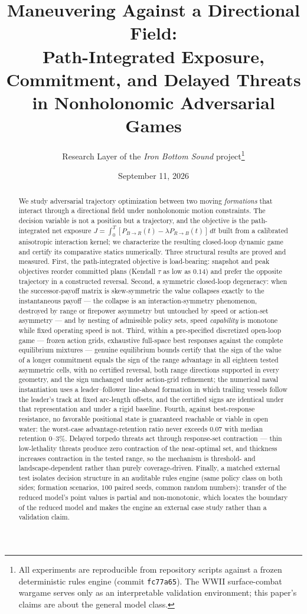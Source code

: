 \documentclass[12pt,a4paper]{article}
\title{Maneuvering Against a Directional Field:\\
Path-Integrated Exposure, Commitment, and Delayed Threats\\
in Nonholonomic Adversarial Games}
\author{Research Layer of the \emph{Iron Bottom Sound} project\thanks{All
experiments are reproducible from repository scripts against a frozen
deterministic rules engine (commit \texttt{fc77a65}).  The WWII surface-combat
wargame serves only as an interpretable validation environment; this paper's
claims are about the general model class.}}
\date{September 11, 2026}
\begin{document}
\maketitle

\begin{abstract}
We study adversarial trajectory optimization between two moving
\emph{formations} that interact through a directional field under
nonholonomic motion constraints.  The decision variable is not a position
but a trajectory, and the objective is the path-integrated net exposure
$J=\int_0^T[P_{B\to R}(t)-\lambda P_{R\to B}(t)]\,dt$ built from a
calibrated anisotropic interaction kernel; we characterize the resulting
closed-loop dynamic game and certify its comparative statics numerically.
Three structural results are proved and measured.  First, the
path-integrated objective is load-bearing: snapshot and peak objectives
reorder committed plans (Kendall $\tau$ as low as $0.14$) and prefer the
opposite trajectory in a constructed reversal.  Second, a symmetric
closed-loop degeneracy: when the successor-payoff matrix is skew-symmetric
the value collapses exactly to the instantaneous payoff --- the collapse is
an interaction-symmetry phenomenon, destroyed by range or firepower
asymmetry but untouched by speed or action-set asymmetry --- and by
nesting of admissible policy sets, speed \emph{capability} is monotone
while fixed operating speed is not.  Third, within a pre-specified discretized
open-loop game --- frozen action grids, exhaustive full-space best
responses against the complete equilibrium mixtures --- genuine
equilibrium bounds certify that the sign of the value of a longer
commitment equals the sign of the range advantage in all eighteen tested
asymmetric cells, with no certified reversal, both range directions
supported in every geometry, and the sign unchanged under action-grid
refinement; the numerical naval instantiation uses a leader--follower
line-ahead formation in which trailing vessels follow the leader's track at
fixed arc-length offsets, and the certified signs are identical under that
representation and under a rigid baseline.  Fourth, against best-response resistance, no favorable
positional state is guaranteed reachable or viable in open water: the
worst-case advantage-retention ratio never exceeds $0.07$ with median
retention $0$--$3\%$.  Delayed torpedo threats act through response-set
contraction --- thin low-lethality threats produce zero contraction of the
near-optimal set, and thickness increases contraction in the tested range,
so the mechanism is threshold- and landscape-dependent rather than purely
coverage-driven.  Finally, a matched external test isolates decision
structure in an auditable rules engine (same policy class on both sides;
formation scenarios, $100$ paired seeds, common random numbers): transfer
of the reduced model's point values is partial and non-monotonic, which
locates the boundary of the reduced model and makes the engine an external
case study rather than a validation claim.
\end{abstract}
\end{document}

